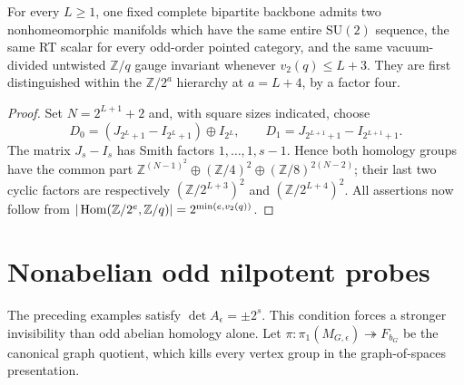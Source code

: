 \begin{corollary}
For every \(L\ge1\), one fixed complete bipartite backbone admits
two nonhomeomorphic manifolds which have the same entire
\(\mathrm{SU}(2)\) sequence, the same RT scalar for every odd-order
pointed category, and the same vacuum-divided untwisted
\(\mathbb Z/q\) gauge invariant whenever \(v_2(q)\le L+3\).
They are first distinguished within the \(\mathbb Z/2^a\) hierarchy
at \(a=L+4\), by a factor four.
\end{corollary}
\begin{proof}
Set \(N=2^{L+1}+2\) and, with square sizes indicated, choose
\[
 D_0=(J_{2^L+1}-I_{2^L+1})\oplus I_{2^L},\qquad
 D_1=J_{2^{L+1}+1}-I_{2^{L+1}+1}.
\]
The matrix \(J_s-I_s\) has Smith factors
\(1,\ldots,1,s-1\). Hence both homology groups have the common
part
\(\mathbb Z^{(N-1)^2}\oplus(\mathbb Z/4)^2
\oplus(\mathbb Z/8)^{2(N-2)}\); their last two cyclic factors
are respectively \((\mathbb Z/2^{L+3})^2\) and
\((\mathbb Z/2^{L+4})^2\). All assertions now follow from
\(|\operatorname{Hom}(\mathbb Z/2^e,\mathbb Z/q)|=2^{\min(e,v_2(q))}\).
\end{proof}

\section{Nonabelian odd nilpotent probes}
The preceding examples satisfy \(\det A_\epsilon=\pm2^s\). This
condition forces a stronger invisibility than odd abelian homology alone.
Let \(\pi:\pi_1(M_{G,\epsilon})\twoheadrightarrow F_{b_G}\) be the
canonical graph quotient, which kills every vertex group in the
graph-of-spaces presentation.

